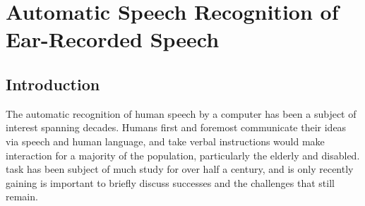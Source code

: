 % 
% 
% 

\chapter{Automatic Speech Recognition of Ear-Recorded Speech\label{chapter4}}


\section{Introduction}\label{chap4:introduction}

The automatic recognition of human speech by a computer has been a subject of interest spanning decades.  Humans first and foremost communicate their ideas via speech and human language, and \DIFdelbegin {}\DIFdelend \DIFaddbegin {}\DIFaddend take verbal instructions would make interaction \DIFdelbegin {}\DIFdelend \DIFaddbegin {}\DIFaddend for a majority of the population, particularly the elderly and disabled. \DIFdelbegin {}\DIFdelend \DIFaddbegin {}\DIFaddend task has been \DIFdelbegin {}\DIFdelend \DIFaddbegin {}\DIFaddend subject of much study for over half a century, and is only recently gaining \DIFdelbegin {}\DIFdelend \DIFaddbegin {}\DIFaddend is important to briefly discuss \DIFdelbegin {}\DIFdelend \DIFaddbegin {}\DIFaddend successes and the challenges that still remain.

